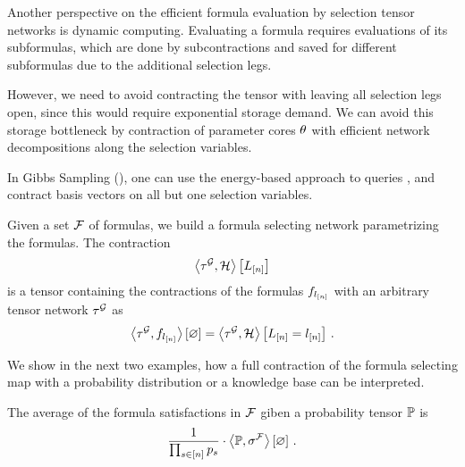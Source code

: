 Another perspective on the efficient formula evaluation by selection tensor networks is dynamic computing.
Evaluating a formula requires evaluations of its subformulas, which are done by subcontractions and saved for different subformulas due to the additional selection legs.

However, we need to avoid contracting the tensor with leaving all selection legs open, since this would require exponential storage demand.
We can avoid this storage bottleneck by contraction of parameter cores $\theta$ with efficient network decompositions along the selection variables. %

In Gibbs Sampling (), one can use the energy-based approach to queries , and contract basis vectors on all but one selection variables.





Given a set $\mathcal{F}$ of formulas, we build a formula selecting network parametrizing the formulas.
The contraction
\begin{align*}
    \left\langle \tau^{\mathcal{G}},\mathcal{H}\right\rangle \left[ L_{[n]} \right]
\end{align*}
is a tensor containing the contractions of the formulas $f_{l_{[n]}}$ with an arbitrary tensor network $\tau^{\mathcal{G}}$ as
\begin{align*}
    \left\langle \tau^{\mathcal{G}},f_{l_{[n]}}\right\rangle \left[ \varnothing \right] = \left\langle \tau^{\mathcal{G}},\mathcal{H}\right\rangle \left[ L_{[n]}=l_{[n]} \right] \, .
\end{align*}



We show in the next two examples, how a full contraction of the formula selecting map with a probability distribution or a knowledge base can be interpreted.

\begin{example}
    The average of the formula satisfactions in $\mathcal{F}$ giben a probability tensor $\mathbb{P}$ is
    \[ \frac{1}{\prod_{s\in[n]}p_{s}} \cdot \left\langle \mathbb{P},\sigma^{\mathcal{F}}\right\rangle \left[ \varnothing \right] \, . \]
\end{example}


